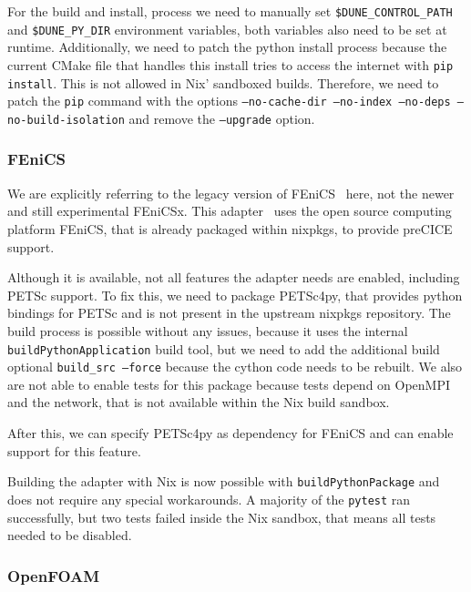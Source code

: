 \documentclass{eceasst}
\begin{document}
For the build and install, process we need to manually set \texttt{\$DUNE\_CONTROL\_PATH} and \texttt{\$DUNE\_PY\_DIR} environment variables, both variables also need to be set at runtime.
Additionally, we need to patch the python install process because the current CMake file that handles this install tries to access the internet with \texttt{pip install}.
This is not allowed in Nix' sandboxed builds.
Therefore, we need to patch the \texttt{pip} command with the options \texttt{--no-cache-dir --no-index --no-deps --no-build-isolation} and remove the \texttt{--upgrade} option.\\

\subsubsection{FEniCS}

We are explicitly referring to the legacy version of FEniCS~\cite{fenics} here, not the newer and still experimental FEniCSx.
This adapter~\cite{Rodenberg2021} uses the open source computing platform FEniCS, that is already packaged within nixpkgs, to provide preCICE support.

Although it is available, not all features the adapter needs are enabled, including PETSc support.
To fix this, we need to package PETSc4py, that provides python bindings for PETSc and is not present in the upstream nixpkgs repository.
The build process is possible without any issues, because it uses the internal \texttt{buildPythonApplication} build tool, but we need to add the additional build optional \texttt{build\_src --force} because the cython code needs to be rebuilt.
We also are not able to enable tests for this package because tests depend on OpenMPI and the network, that is not available within the Nix build sandbox.

After this, we can specify PETSc4py as dependency for FEniCS and can enable support for this feature.

Building the adapter with Nix is now possible with \texttt{buildPythonPackage} and does not require any special workarounds.
A majority of the \texttt{pytest} ran successfully, but two tests failed inside the Nix sandbox, that means all tests needed to be disabled.\\

\subsubsection{OpenFOAM}
\end{document}
